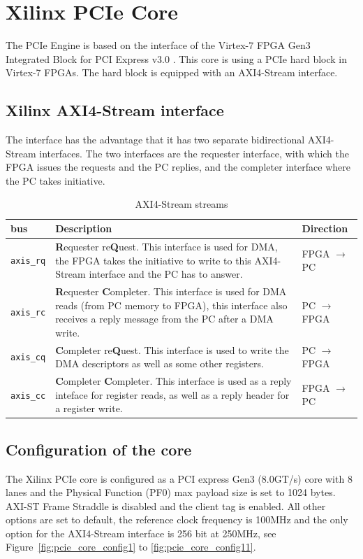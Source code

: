 \section{Xilinx PCIe Core}
The PCIe Engine is based on the interface of the Virtex-7 FPGA Gen3 Integrated Block for PCI Express v3.0 \cite{pg023}. This core is using a PCIe hard block in Virtex-7 FPGAs. The hard block is equipped with an AXI4-Stream interface.
\subsection{Xilinx AXI4-Stream interface}
The interface has the advantage that it has two separate bidirectional AXI4-Stream interfaces. The two interfaces are the requester interface, with which the FPGA issues the requests and the PC replies, and the completer interface where the PC takes initiative.
\begin{table}[H]
	\centering
	\begin{tabularx}{\textwidth}{|l|X|l|}
	\hline
	  \textbf{bus} & \textbf{Description} &\textbf{Direction}\\
	\hline
	\texttt{axis\_rq} & \textbf{R}equester re\textbf{Q}uest. This interface is used for DMA, the FPGA takes the initiative to write to this AXI4-Stream interface and the PC has to answer. &FPGA $\rightarrow$ PC\\
	\hline
	\texttt{axis\_rc} & \textbf{R}equester \textbf{C}ompleter. This interface is used for DMA reads (from PC memory to FPGA), this interface also receives a reply message from the PC after a DMA write.&PC $\rightarrow$ FPGA\\
	\hline
	\texttt{axis\_cq} & \textbf{C}ompleter re\textbf{Q}uest. This interface is used to write the DMA descriptors as well as some other registers. & PC $\rightarrow$ FPGA\\
	\hline
	\texttt{axis\_cc} & \textbf{C}ompleter \textbf{C}ompleter. This interface is used as a reply inteface for register reads, as well as a reply header for a register write. & FPGA $\rightarrow$ PC\\
	\hline
	
	\end{tabularx}
	\caption{AXI4-Stream streams}\label{tab:axi_streams}
\end{table}
\subsection{Configuration of the core}
The Xilinx PCIe core is configured as a PCI express Gen3 (8.0GT/s) core with 8 lanes and the Physical Function (PF0) max payload size is set to 1024 bytes. AXI-ST Frame Straddle is disabled and the client tag is enabled. All other options are set to default, the reference clock frequency is 100MHz and the only option for the AXI4-Stream interface is 256 bit at 250MHz, see Figure~\ref{fig:pcie_core_config1} to \ref{fig:pcie_core_config11}.
\newpage

